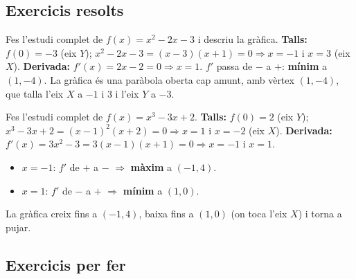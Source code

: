 \subsection{Exercicis resolts}

\begin{exresolt}
Fes l'estudi complet de $f(x)=x^2-2x-3$ i descriu la gràfica.
\solucio
\textbf{Talls:} $f(0)=-3$ (eix $Y$); $x^2-2x-3=(x-3)(x+1)=0\Rightarrow x=-1$ i $x=3$
(eix $X$). \textbf{Derivada:} $f'(x)=2x-2=0\Rightarrow x=1$. $f'$ passa de $-$ a $+$:
\textbf{mínim} a $(1,-4)$. La gràfica és una paràbola oberta cap amunt, amb vèrtex
$(1,-4)$, que talla l'eix $X$ a $-1$ i $3$ i l'eix $Y$ a $-3$.
\end{exresolt}

\begin{exresolt}
Fes l'estudi complet de $f(x)=x^3-3x+2$.
\solucio
\textbf{Talls:} $f(0)=2$ (eix $Y$); $x^3-3x+2=(x-1)^2(x+2)=0\Rightarrow x=1$ i $x=-2$
(eix $X$). \textbf{Derivada:} $f'(x)=3x^2-3=3(x-1)(x+1)=0\Rightarrow x=-1$ i $x=1$.
\begin{itemize}[leftmargin=1.4em, itemsep=2pt]
  \item $x=-1$: $f'$ de $+$ a $-$ $\Rightarrow$ \textbf{màxim} a $(-1,4)$.
  \item $x=1$: $f'$ de $-$ a $+$ $\Rightarrow$ \textbf{mínim} a $(1,0)$.
\end{itemize}
La gràfica creix fins a $(-1,4)$, baixa fins a $(1,0)$ (on toca l'eix $X$) i torna a
pujar.
\end{exresolt}

\subsection{Exercicis per fer}

